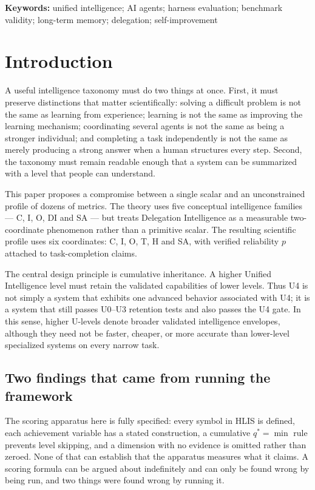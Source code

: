 \documentclass[11pt]{article}
\theoremstyle{definition}
\begin{document}
\noindent\textbf{Keywords:} unified intelligence; AI agents; harness evaluation; benchmark validity; long-term memory; delegation; self-improvement

\tableofcontents
\bigskip

\section{Introduction}

A useful intelligence taxonomy must do two things at once. First, it must preserve distinctions that matter scientifically: solving a difficult problem is not the same as learning from experience; learning is not the same as improving the learning mechanism; coordinating several agents is not the same as being a stronger individual; and completing a task independently is not the same as merely producing a strong answer when a human structures every step. Second, the taxonomy must remain readable enough that a system can be summarized with a level that people can understand.

This paper proposes a compromise between a single scalar and an unconstrained profile of dozens of metrics. The theory uses five conceptual intelligence families --- C, I, O, DI and SA --- but treats Delegation Intelligence as a measurable two-coordinate phenomenon rather than a primitive scalar. The resulting scientific profile uses six coordinates: C, I, O, T, H and SA, with verified reliability $p$ attached to task-completion claims.

The central design principle is cumulative inheritance. A higher Unified Intelligence level must retain the validated capabilities of lower levels. Thus U4 is not simply a system that exhibits one advanced behavior associated with U4; it is a system that still passes U0--U3 retention tests and also passes the U4 gate. In this sense, higher U-levels denote broader validated intelligence envelopes, although they need not be faster, cheaper, or more accurate than lower-level specialized systems on every narrow task.

\subsection{Two findings that came from running the framework}

The scoring apparatus here is fully specified: every symbol in HLIS is defined, each achievement variable has a stated construction, a cumulative $q^{*}=\min$ rule prevents level skipping, and a dimension with no evidence is omitted rather than zeroed. None of that can establish that the apparatus measures what it claims. A scoring formula can be argued about indefinitely and can only be found wrong by being run, and two things were found wrong by running it.
\end{document}
